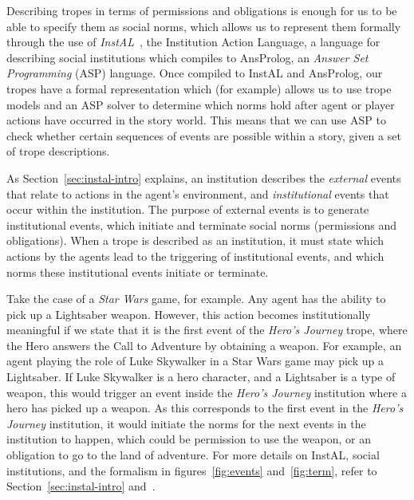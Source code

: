 \documentclass[11pt]{report}
\begin{document}
Describing tropes in terms of permissions and obligations is enough for us to be
able to specify them as social norms, which allows us to represent them
formally through the use of \emph{InstAL}~\citep{cliffe2007specifying}, the
Institution Action Language, a language for describing social institutions which compiles to AnsProlog, an \emph{Answer Set Programming} (ASP) language.
Once compiled to InstAL and AnsProlog, our tropes have a formal representation
which (for example) allows us to use trope models and an ASP solver to determine
which norms hold after agent or player actions have occurred in the story world.
This means that we can use ASP to check whether certain sequences of events are possible within a story,
given a set of trope descriptions.

As Section~\ref{sec:instal-intro} explains, an institution describes the
\emph{external} events that relate to actions in the agent's environment, and
\emph{institutional} events that occur within the institution. The purpose of
external events is to generate institutional events, which initiate and
terminate social norms (permissions and obligations). When a trope is described
as an institution, it must state which actions by the agents lead
to the triggering of institutional events, and which norms these institutional
events initiate or terminate.

Take the case of a \emph{Star Wars} game, for example. Any agent has the ability
to pick up a Lightsaber weapon. However, this action becomes institutionally
meaningful if we state that it is the first event of the \emph{Hero's Journey}
trope, where the Hero answers the Call to Adventure by obtaining a weapon.
For example, an agent playing the role of Luke Skywalker in a Star Wars game may
pick up a Lightsaber. If Luke Skywalker is a hero character, and a Lightsaber is
a type of weapon, this would trigger an event inside the \emph{Hero's Journey}
institution where a hero has
picked up a weapon. As this corresponds to the first event in the \emph{Hero's
  Journey} institution, it would initiate the norms for the next events in
the institution to happen, which could be permission to use the weapon, or an obligation to go to the land of adventure.
For more details on InstAL, social institutions, and the formalism in
figures~\ref{fig:events} and~\ref{fig:term}, refer to
Section~\ref{sec:instal-intro} and~\citep{cliffe2007specifying}.
\end{document}
